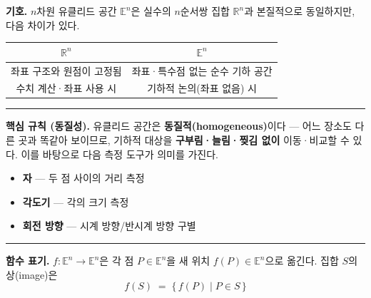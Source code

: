 \documentclass{article}
\begin{document}
\begin{tcolorbox}[
  colback=teal!4, colframe=teal!65!black,
  title=정의 \& 핵심 규칙,
  fonttitle=\bfseries, boxrule=0.5mm, arc=3mm]

\textbf{\textcolor{teal!65!black}{기호.}}\quad
$n$차원 유클리드 공간 $\mathbb{E}^n$은 실수의 $n$순서쌍 집합 $\mathbb{R}^n$과
본질적으로 동일하지만, 다음 차이가 있다.

\medskip
\begin{center}
\renewcommand{\arraystretch}{1.3}
\begin{tabular}{|c|c|}
\hline
$\mathbb{R}^n$ & $\mathbb{E}^n$ \\
\hline
좌표 구조와 원점이 고정됨 & 좌표·특수점 없는 순수 기하 공간 \\
수치 계산·좌표 사용 시 & 기하적 논의(좌표 없음) 시 \\
\hline
\end{tabular}
\end{center}

\noindent\textcolor{teal!50!black}{\rule{\linewidth}{0.4pt}}

\textbf{\textcolor{teal!65!black}{핵심 규칙 (동질성).}}\quad
유클리드 공간은 \textbf{동질적(homogeneous)}이다 --- 어느 장소도 다른 곳과 똑같아
보이므로, 기하적 대상을 \textbf{구부림·늘림·찢김 없이} 이동·비교할 수 있다.
이를 바탕으로 다음 측정 도구가 의미를 가진다.
\begin{itemize}\setlength\itemsep{0pt}
  \item \textbf{자} --- 두 점 사이의 거리 측정
  \item \textbf{각도기} --- 각의 크기 측정
  \item \textbf{회전 방향} --- 시계 방향/반시계 방향 구별
\end{itemize}

\noindent\textcolor{teal!50!black}{\rule{\linewidth}{0.4pt}}

\textbf{\textcolor{teal!65!black}{함수 표기.}}\quad
$f : \mathbb{E}^n \to \mathbb{E}^n$은 각 점 $P \in \mathbb{E}^n$을 새 위치
$f(P) \in \mathbb{E}^n$으로 옮긴다. 집합 $S$의 상(image)은
\[
  f(S) \;=\; \{\, f(P) \mid P \in S \,\}
\]

\end{tcolorbox}
\end{document}
